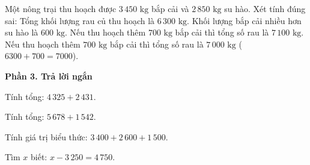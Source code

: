 \begin{ex} %
Một nông trại thu hoạch được $3\,450\text{ kg}$ bắp cải và $2\,850\text{ kg}$ su hào. Xét tính đúng sai:
\choiceTF
{\True Tổng khối lượng rau củ thu hoạch là $6\,300\text{ kg}$.}
{\True Khối lượng bắp cải nhiều hơn su hào là $600\text{ kg}$.}
{Nếu thu hoạch thêm $700\text{ kg}$ bắp cải thì tổng số rau là $7\,100\text{ kg}$.}
{\True Nếu thu hoạch thêm $700\text{ kg}$ bắp cải thì tổng số rau là $7\,000\text{ kg}$ ($6300 + 700 = 7000$).}
\end{ex}

\textbf{Phần 3. Trả lời ngắn}

\begin{ex} %
Tính tổng: $4\,325 + 2\,431$.
\end{ex}

\begin{ex} %
Tính tổng: $5\,678 + 1\,542$.
\end{ex}

\begin{ex} %
Tính giá trị biểu thức: $3\,400 + 2\,600 + 1\,500$.
\end{ex}

\begin{ex} %
Tìm $x$ biết: $x - 3\,250 = 4\,750$.
\end{ex}

